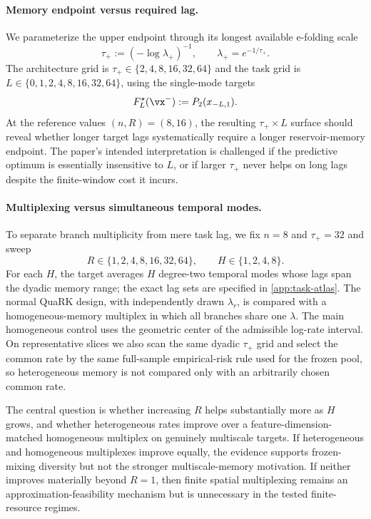 \paragraph{Memory endpoint versus required lag.}
We parameterize the upper endpoint through its longest available e-folding
scale
\begin{equation}
    \tau_+:=(-\log\lambda_+)^{-1},
    \qquad \lambda_+=e^{-1/\tau_+}.
    \label{eq:memory-horizon-param}
\end{equation}
The architecture grid is
$\tau_+\in\{2,4,8,16,32,64\}$ and the task grid is
$L\in\{0,1,2,4,8,16,32,64\}$, using the single-mode targets
\begin{equation}
    F_L^\star(\vx^-):=P_2(x_{-L,1}).
    \label{eq:single-memory-task}
\end{equation}
At the reference values $(n,R)=(8,16)$, the resulting $\tau_+\times L$ surface should reveal whether
longer target lags systematically require a longer reservoir-memory endpoint.
The paper's intended interpretation is challenged if the predictive optimum
is essentially insensitive to $L$, or if larger $\tau_+$ never helps on long
lags despite the finite-window cost it incurs.

\paragraph{Multiplexing versus simultaneous temporal modes.}
To separate branch multiplicity from mere task lag, we fix
$n=8$ and $\tau_+=32$ and sweep
\begin{equation}
    R\in\{1,2,4,8,16,32,64\},
    \qquad
    H\in\{1,2,4,8\}.
    \label{eq:R-H-grid}
\end{equation}
For each $H$, the target averages $H$ degree-two temporal modes whose lags span
the dyadic memory range; the exact lag sets are specified in
\cref{app:task-atlas}.  The normal QuaRK design, with independently drawn
$\lambda_r$, is compared with a homogeneous-memory multiplex in which all
branches share one $\lambda$.  The main homogeneous control uses the geometric
center of the admissible log-rate interval.  On representative slices we also
scan the same dyadic $\tau_+$ grid and select the common rate by the same
full-sample empirical-risk rule used for the frozen pool, so heterogeneous
memory is not compared only with an arbitrarily chosen common rate.

The central question is whether increasing $R$ helps substantially more as
$H$ grows, and whether heterogeneous rates improve over a feature-dimension-
matched homogeneous multiplex on genuinely multiscale targets.  If
heterogeneous and homogeneous multiplexes improve equally, the evidence
supports frozen-mixing diversity but not the stronger multiscale-memory
motivation.  If neither improves materially beyond $R=1$, then finite spatial
multiplexing remains an approximation-feasibility mechanism but is unnecessary
in the tested finite-resource regimes.


